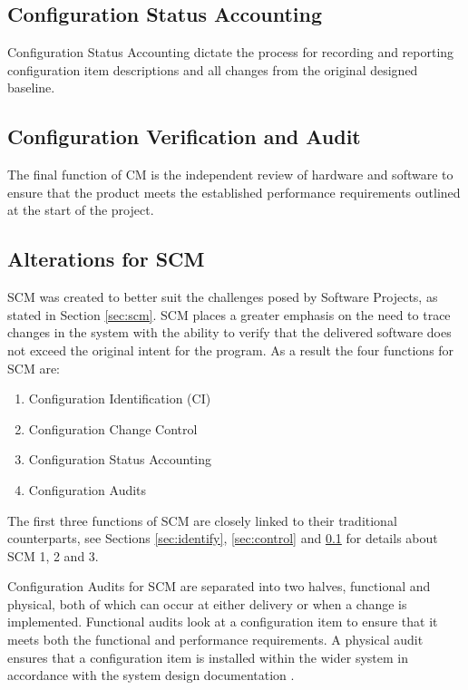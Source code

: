 \documentclass[cmpstyle]{ueacmpstyle}
\begin{document}
		\subsection{Configuration Status Accounting} \label{sec:accounting}
		Configuration Status Accounting dictate the process for recording and reporting configuration item descriptions and all changes from the original designed baseline.
		
		\subsection{Configuration Verification and Audit} \label{sec:audit}
		The final function of CM is the independent review of hardware and software to ensure that the product meets the established performance requirements outlined at the start of the project.
		
		\subsection{Alterations for SCM} \label{sec:scm-alterations}
		SCM was created to better suit the challenges posed by Software Projects, as stated in Section \ref{sec:scm}. SCM places a greater emphasis on the need to trace changes in the system with the ability to verify that the delivered software does not exceed the original intent for the program. As a result the four functions for SCM are:
		
		\begin{enumerate}
			\item Configuration Identification (CI)
			\item Configuration Change Control
			\item Configuration Status Accounting
			\item Configuration Audits
		\end{enumerate}
	
		The first three functions of SCM are closely linked to their traditional counterparts, see Sections \ref{sec:identify}, \ref{sec:control} and \ref{sec:accounting} for details about SCM 1, 2 and 3. 
		
		Configuration Audits for SCM are separated into two halves, functional and physical, both of which can occur at either delivery or when a change is implemented. Functional audits look at a configuration item to ensure that it meets both the functional and performance requirements. A physical audit ensures that a configuration item is installed within the wider system in accordance with the system design documentation .
		
\end{document}
